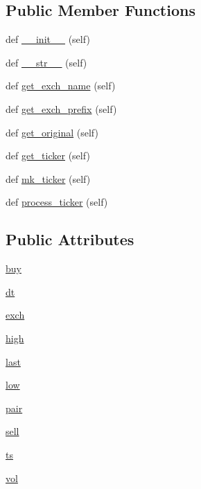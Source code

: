 \subsection*{Public Member Functions}
\begin{DoxyCompactItemize}
\item 
def \hyperlink{classexchange_1_1_mercado_bitcoin_a7ae88346e48e6e1fa70ebe3281ba7357}{\+\_\+\+\_\+init\+\_\+\+\_\+} (self)
\item 
def \hyperlink{classexchange_1_1_mercado_bitcoin_a42dd78e0cca02c3ab3c185545a879b26}{\+\_\+\+\_\+str\+\_\+\+\_\+} (self)
\item 
def \hyperlink{classexchange_1_1_mercado_bitcoin_a0d7b9201247f88f3013e83fd8e8012d0}{get\+\_\+exch\+\_\+name} (self)
\item 
def \hyperlink{classexchange_1_1_mercado_bitcoin_a61500a3a404e9dc0279717d1d2de85f4}{get\+\_\+exch\+\_\+prefix} (self)
\item 
def \hyperlink{classexchange_1_1_mercado_bitcoin_a821c555e2d39fb9993d0c1c381837aa8}{get\+\_\+original} (self)
\item 
def \hyperlink{classexchange_1_1_mercado_bitcoin_a2e6fe3e59daf6791688af7ed15772452}{get\+\_\+ticker} (self)
\item 
def \hyperlink{classexchange_1_1_mercado_bitcoin_a5c2280e8efc3dd148d724e9b73bd9243}{mk\+\_\+ticker} (self)
\item 
def \hyperlink{classexchange_1_1_mercado_bitcoin_a2acc4c0710269e72bc9547508be97117}{process\+\_\+ticker} (self)
\end{DoxyCompactItemize}
\subsection*{Public Attributes}
\begin{DoxyCompactItemize}
\item 
\hyperlink{classexchange_1_1_mercado_bitcoin_ada27b62a35286b9f5dbb54590c5bacd2}{buy}
\item 
\hyperlink{classexchange_1_1_mercado_bitcoin_aeee983ba4f72223a11fb914d22902c56}{dt}
\item 
\hyperlink{classexchange_1_1_mercado_bitcoin_a68701550b43374441e52ea2082d88400}{exch}
\item 
\hyperlink{classexchange_1_1_mercado_bitcoin_a0b9c2d465601a48e3b8838354e931c39}{high}
\item 
\hyperlink{classexchange_1_1_mercado_bitcoin_a5f2759cd17d5dd36bc813c815543f3cc}{last}
\item 
\hyperlink{classexchange_1_1_mercado_bitcoin_aaa3aae824bfc5ba3b7dc5252e9554713}{low}
\item 
\hyperlink{classexchange_1_1_mercado_bitcoin_a879f8ca352d313230d72e6e8785985a1}{pair}
\item 
\hyperlink{classexchange_1_1_mercado_bitcoin_a9982c7a3f6103c88c64160a5854c35cd}{sell}
\item 
\hyperlink{classexchange_1_1_mercado_bitcoin_ac4630b08e08f9eeb9dad838dc9dc0cda}{ts}
\item 
\hyperlink{classexchange_1_1_mercado_bitcoin_a1c163489086ba85b960db821117cd433}{vol}
\end{DoxyCompactItemize}
